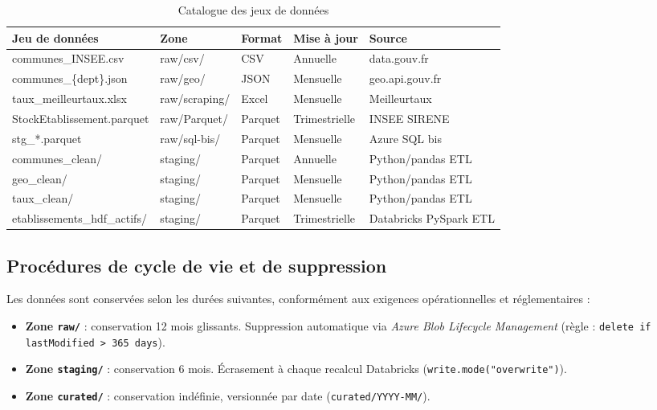 \documentclass[12pt,a4paper]{article}
\begin{document}
\begin{table}[H]
\centering
\small
\begin{tabular}{L{3cm} L{2.5cm} L{2cm} L{2cm} L{3.5cm}}
  \toprule
  \textbf{Jeu de données} & \textbf{Zone} & \textbf{Format} & \textbf{Mise à jour} & \textbf{Source} \\
  \midrule
  communes\_INSEE.csv & raw/csv/ & CSV & Annuelle & data.gouv.fr \\
  communes\_\{dept\}.json & raw/geo/ & JSON & Mensuelle & geo.api.gouv.fr \\
  taux\_meilleurtaux.xlsx & raw/scraping/ & Excel & Mensuelle & Meilleurtaux \\
  StockEtablissement.parquet & raw/Parquet/ & Parquet & Trimestrielle & INSEE SIRENE \\
  stg\_*.parquet & raw/sql-bis/ & Parquet & Mensuelle & Azure SQL bis \\
  communes\_clean/ & staging/ & Parquet & Annuelle & Python/pandas ETL \\
  geo\_clean/ & staging/ & Parquet & Mensuelle & Python/pandas ETL \\
  taux\_clean/ & staging/ & Parquet & Mensuelle & Python/pandas ETL \\
  etablissements\_hdf\_actifs/ & staging/ & Parquet & Trimestrielle & Databricks PySpark ETL \\
  \bottomrule
\end{tabular}
\caption{Catalogue des jeux de données}
\end{table}

\subsection{Procédures de cycle de vie et de suppression}

Les données sont conservées selon les durées suivantes, conformément aux exigences opérationnelles et réglementaires :

\begin{itemize}
  \item \textbf{Zone \texttt{raw/}} : conservation 12 mois glissants. Suppression automatique via \textit{Azure Blob Lifecycle Management} (règle : \texttt{delete if lastModified > 365 days}).
  \item \textbf{Zone \texttt{staging/}} : conservation 6 mois. Écrasement à chaque recalcul Databricks (\texttt{write.mode("overwrite")}).
  \item \textbf{Zone \texttt{curated/}} : conservation indéfinie, versionnée par date (\texttt{curated/YYYY-MM/}).
\end{itemize}
\end{document}
